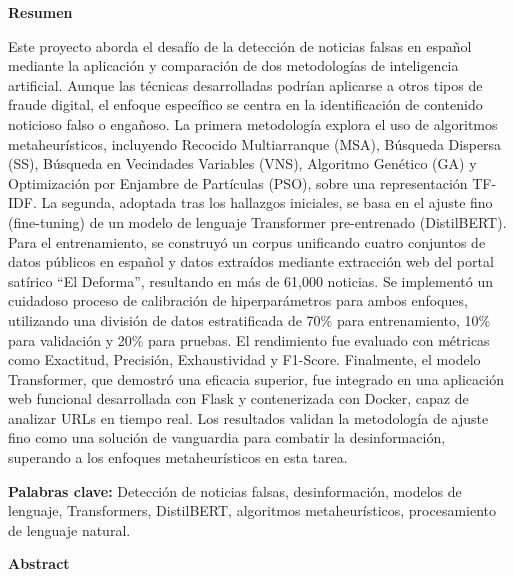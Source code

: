 
\cleardoublepage
\thispagestyle{plain}  
\vspace{0.9cm}
\textbf{{\Large Resumen}}
\vspace{0.9cm}

Este proyecto aborda el desafío de la detección de noticias falsas en español mediante la aplicación y comparación de dos metodologías de inteligencia artificial. Aunque las técnicas desarrolladas podrían aplicarse a otros tipos de fraude digital, el enfoque específico se centra en la identificación de contenido noticioso falso o engañoso. La primera metodología explora el uso de algoritmos metaheurísticos, incluyendo Recocido Multiarranque (MSA), Búsqueda Dispersa (SS), Búsqueda en Vecindades Variables (VNS), Algoritmo Genético (GA) y Optimización por Enjambre de Partículas (PSO), sobre una representación TF-IDF. La segunda, adoptada tras los hallazgos iniciales, se basa en el ajuste fino (fine-tuning) de un modelo de lenguaje Transformer pre-entrenado (DistilBERT). Para el entrenamiento, se construyó un corpus unificando cuatro conjuntos de datos públicos en español y datos extraídos mediante extracción web del portal satírico ``El Deforma'', resultando en más de 61,000 noticias. Se implementó un cuidadoso proceso de calibración de hiperparámetros para ambos enfoques, utilizando una división de datos estratificada de 70\% para entrenamiento, 10\% para validación y 20\% para pruebas. El rendimiento fue evaluado con métricas como Exactitud, Precisión, Exhaustividad y F1-Score. Finalmente, el modelo Transformer, que demostró una eficacia superior, fue integrado en una aplicación web funcional desarrollada con Flask y contenerizada con Docker, capaz de analizar URLs en tiempo real. Los resultados validan la metodología de ajuste fino como una solución de vanguardia para combatir la desinformación, superando a los enfoques metaheurísticos en esta tarea.

\vspace{0.9cm}
\textbf{Palabras clave:} Detección de noticias falsas, desinformación, modelos de lenguaje, Transformers, DistilBERT, algoritmos metaheurísticos, procesamiento de lenguaje natural.

\cleardoublepage

{}
\thispagestyle{plain}

\thispagestyle{plain}  
\vspace{0.9cm}
\textbf{{\Large Abstract}}
\vspace{0.9cm}

